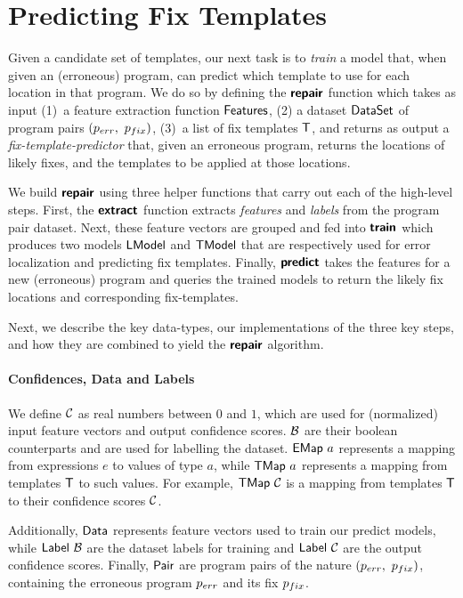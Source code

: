 \section{Predicting Fix Templates}
\label{sec:templ-pred}

Given a candidate set of templates, our next task is to \emph{train} a model
that, when given an (erroneous) program, can predict which template to use for
each location in that program.
%
We do so by defining the $\bm{\mathsf{repair}}$ function which takes as input
%
(1)~a feature extraction function $\mathsf{Features}$,
%
(2) a dataset $\mathsf{DataSet}$ of program pairs $(p_{err},\ p_{fix})$,
%
(3)~a list of fix templates $\mathsf{T}$,
%
and returns as output a \emph{fix-template-predictor} that, given an erroneous
program, returns the locations of likely fixes, and the templates to be applied
at those locations.

We build $\bm{\mathsf{repair}}$ using three helper functions that carry out each of the
high-level steps.
%
First, the $\bm{\mathsf{extract}}$ function extracts \emph{features} and \emph{labels}
from the program pair dataset. Next, these feature vectors are grouped and fed
into $\bm{\mathsf{train}}$ which produces two models $\mathsf{LModel}$ and $\mathsf{TModel}$ that are
respectively used for error localization and predicting fix templates.
%
Finally, $\bm{\mathsf{predict}}$ takes the features for a new (erroneous) program and
queries the trained models to return the likely fix locations and corresponding
fix-templates.

Next, we describe the key data-types, our implementations of the three key
steps, and how they are combined to yield the $\bm{\mathsf{repair}}$ algorithm.

\paragraph{Confidences, Data and Labels}
We define $\mathcal{C}$ as real numbers between $0$ and $1$, which are used for
(normalized) input feature vectors and output confidence scores. $\mathcal{B}$ are
their boolean counterparts and are used for labelling the dataset. $\mathsf{EMap}\ a$
represents a mapping from expressions $e$ to values of type $a$, while
$\mathsf{TMap}\ a$ represents a mapping from templates $\mathsf{T}$ to such values. For example,
$\mathsf{TMap}\ \mathcal{C}$ is a mapping from templates $\mathsf{T}$ to their confidence scores
$\mathcal{C}$.

Additionally, $\mathsf{Data}$ represents feature vectors used to train our predict
models, while $\mathsf{Label}\ \mathcal{B}$ are the dataset labels for training and
$\mathsf{Label}\ \mathcal{C}$ are the output confidence scores. Finally, $\mathsf{Pair}$ are
program pairs of the nature $(p_{err},\ p_{fix})$, containing the erroneous program
$p_{err}$ and its fix $p_{fix}$.

